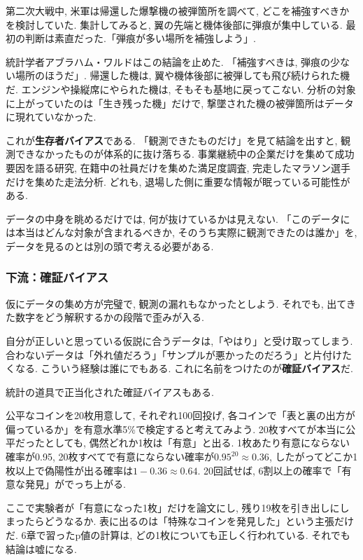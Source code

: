 第二次大戦中, 米軍は帰還した爆撃機の被弾箇所を調べて, どこを補強すべきかを検討していた.
集計してみると, 翼の先端と機体後部に弾痕が集中している.
最初の判断は素直だった.「弾痕が多い場所を補強しよう」.

統計学者アブラハム・ワルドはこの結論を止めた.
「補強すべきは, 弾痕の少ない場所のほうだ」.
帰還した機は, 翼や機体後部に被弾しても飛び続けられた機だ.
エンジンや操縦席にやられた機は, そもそも基地に戻ってこない.
分析の対象に上がっていたのは「生き残った機」だけで, 撃墜された機の被弾箇所はデータに現れていなかった.

これが\textbf{生存者バイアス}である.
「観測できたものだけ」を見て結論を出すと, 観測できなかったものが体系的に抜け落ちる.
事業継続中の企業だけを集めて成功要因を語る研究, 在籍中の社員だけを集めた満足度調査, 完走したマラソン選手だけを集めた走法分析.
どれも, 退場した側に重要な情報が眠っている可能性がある.

データの中身を眺めるだけでは, 何が抜けているかは見えない.
「このデータには本当はどんな対象が含まれるべきか, そのうち実際に観測できたのは誰か」を, データを見るのとは別の頭で考える必要がある.

\subsubsection*{下流：確証バイアス}

仮にデータの集め方が完璧で, 観測の漏れもなかったとしよう.
それでも, 出てきた数字をどう解釈するかの段階で歪みが入る.

自分が正しいと思っている仮説に合うデータは,「やはり」と受け取ってしまう.
合わないデータは「外れ値だろう」「サンプルが悪かったのだろう」と片付けたくなる.
こういう経験は誰にでもある. これに名前をつけたのが\textbf{確証バイアス}だ.

統計の道具で正当化された確証バイアスもある.

公平なコインを20枚用意して, それぞれ100回投げ, 各コインで「表と裏の出方が偏っているか」を有意水準5\%で検定すると考えてみよう.
20枚すべてが本当に公平だったとしても, 偶然どれか1枚は「有意」と出る.
1枚あたり有意にならない確率が0.95, 20枚すべてで有意にならない確率が$0.95^{20} \approx 0.36$, したがってどこか1枚以上で偽陽性が出る確率は$1 - 0.36 \approx 0.64$.
20回試せば, 6割以上の確率で「有意な発見」がでっち上がる.

ここで実験者が「有意になった1枚」だけを論文にし, 残り19枚を引き出しにしまったらどうなるか.
表に出るのは「特殊なコインを発見した」という主張だけだ.
6章で習ったp値の計算は, どの1枚についても正しく行われている.
それでも結論は嘘になる.

